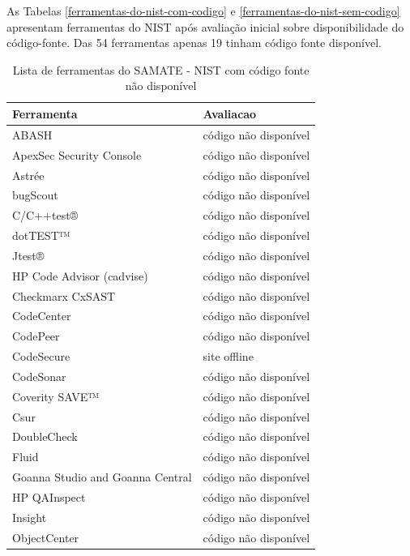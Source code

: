 \documentclass[qual, classic, a4paper]{ufbathesis}
\begin{document}
As Tabelas \ref{ferramentas-do-nist-com-codigo} e
\ref{ferramentas-do-nist-sem-codigo} apresentam ferramentas do NIST após
avaliação inicial sobre disponibilidade do código-fonte. Das 54 ferramentas
apenas 19 tinham código fonte disponível.


\begin{table}
\caption{Lista de ferramentas do SAMATE - NIST com código fonte não disponível}
\centering
\begin{tabular}{| l | l |}
\hline
Ferramenta & Avaliacao  \\
\hline
ABASH                     & código não disponível \\
ApexSec Security Console  & código não disponível \\
Astrée                    & código não disponível \\
bugScout                  & código não disponível \\
C/C++test®                & código não disponível \\
dotTEST™                  & código não disponível \\
Jtest®                    & código não disponível \\
HP Code Advisor (cadvise) & código não disponível \\
Checkmarx CxSAST          & código não disponível \\
CodeCenter                & código não disponível \\
CodePeer                  & código não disponível \\
CodeSecure                & site offline \\
CodeSonar                 & código não disponível \\
Coverity SAVE™            & código não disponível \\
Csur                      & código não disponível \\
DoubleCheck               & código não disponível \\
Fluid                     & código não disponível \\
Goanna Studio and Goanna Central & código não disponível \\
HP QAInspect              & código não disponível \\
Insight                   & código não disponível \\
ObjectCenter              & código não disponível \\

\end{tabular}
\end{table}
\end{document}
